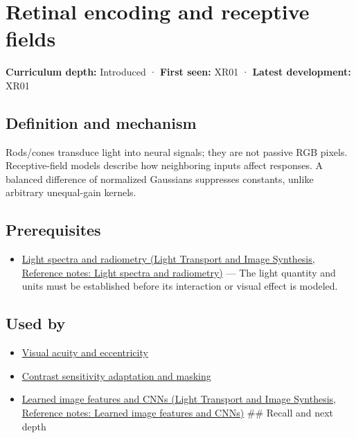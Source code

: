 \hypertarget{appendix-7281c15ac44a}{}\label{referencestart:appendix-7281c15ac44a}
\section{Retinal encoding and receptive fields}\label{appendix-7281c15ac44a-retinal-encoding-and-receptive-fields}

\textbf{Curriculum depth:} Introduced · \textbf{First seen:} XR01 · \textbf{Latest development:} XR01

\begin{allmightroledefinition}

\subsection{Definition and mechanism}\label{appendix-7281c15ac44a-definition-and-mechanism}

Rods/cones transduce light into neural signals; they are not passive RGB pixels. Receptive-field models describe how neighboring inputs affect responses. A balanced difference of normalized Gaussians suppresses constants, unlike arbitrary unequal-gain kernels.

\end{allmightroledefinition}

\subsection{Prerequisites}\label{appendix-7281c15ac44a-prerequisites}

\begin{itemize}
\tightlist
\item
  \href{../04-Light-Transport-and-Image-Synthesis/main.pdf\#nameddest=appendix-215c2570199b}{Light spectra and radiometry (Light Transport and Image Synthesis, Reference notes: Light spectra and radiometry)} --- The light quantity and units must be established before its interaction or visual effect is modeled.
\end{itemize}

\subsection{Used by}\label{appendix-7281c15ac44a-used-by}

\begin{itemize}
\item
  \hyperref[appendix-b491fc48c54b]{Visual acuity and eccentricity}
\item
  \hyperref[appendix-b3aa9e8e01ad]{Contrast sensitivity adaptation and masking}
\item
  \href{../04-Light-Transport-and-Image-Synthesis/main.pdf\#nameddest=appendix-47c51ea026fb}{Learned image features and CNNs (Light Transport and Image Synthesis, Reference notes: Learned image features and CNNs)} \#\# Recall and next depth
\end{itemize}

